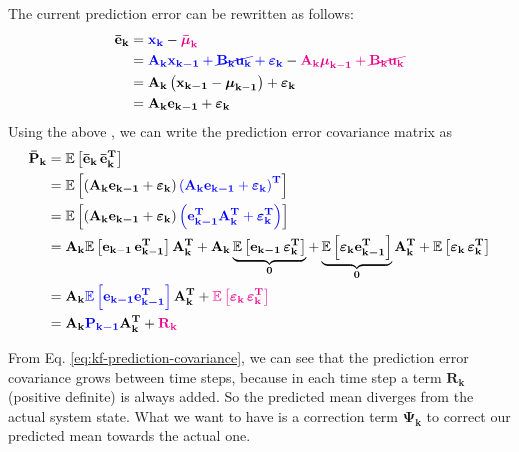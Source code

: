 \documentclass[12pt]{article}
\newcommand{\bvec}[1]{\boldsymbol{\mathbf{#1}}} %
\newcommand{\bvecT}[1]{\boldsymbol{\mathbf{#1^T}}} %
\newcommand{\mat}[1]{\boldsymbol{\mathbf{#1}}}
\newcommand{\matT}[1]{\boldsymbol{\mathbf{#1^T}}}
\newcommand{\brac}[1]{\left[#1\right]} %
\newcommand{\parentheses}[1]{\left(#1\right)}
\newcommand{\mb}[1]{{\boldsymbol{#1}}} %
\newcommand{\expv}[1]{\mathbb{E}\brac{#1}} %
\newcommand{\eps}{\varepsilon}
\newcommand{\blue}[1]{\color{blue}#1\color{black}}
\newcommand{\magenta}[1]{\color{magenta}#1\color{black}}
\begin{document}
The current prediction error can be rewritten as follows:
\begin{equation}
    \begin{aligned}
        \bvec{\bar{e}_k} &= \blue{\bvec{x_k}} - \magenta{\mb{\bar{\mu}}_\mathbf{k}} \\
        &= \blue{\mat{A_k}\bvec{x_{k-1}} + \cancel{\mat{B_k}\bvec{u_k}} + \mb{\eps}_\mathbf{k}} - \magenta{\mat{A_k} \mb{\mu}_\mathbf{k-1} + \cancel{\mat{B_k}\bvec{u_k}} }\\
        &= \mat{A_k}\parentheses{\bvec{x_{k-1}} - \mb{\mu}_\mathbf{k-1}} + \mb{\eps}_\mathbf{k} \\
        &= \mat{A_k}\bvec{e_{k-1}} + \mb{\eps}_\mathbf{k}
    \end{aligned}
\end{equation}
Using the above , we can write the prediction error covariance matrix as
\begin{equation}
    \begin{aligned}
        \mat{\bar{P}_k} &= \expv{\bvec{\bar{e}_k} \, \bvecT{\bar{e}_k}}\\
        &= \expv{\parentheses{\mat{A_k}\bvec{e_{k-1}} + \mb{\varepsilon}_\mathbf{k}} \blue{\parentheses{\mat{A_k}\bvec{e_{k-1}} + \mb{\varepsilon}_\mathbf{k}}^\mathbf{T}}}\\
        &= \expv{\parentheses{\mat{A_k}\bvec{e_{k-1}} + \mb{\varepsilon}_\mathbf{k}} \blue{\parentheses{\bvecT{e_{k-1}}\matT{A_k} + \mb{\varepsilon}_\mathbf{k}^\mathbf{T}}}}\\
        &= \mat{A_k}\expv{\mathbf{e_{k-1}\,e_{k-1}^T}}\matT{A_k} + \mat{A_k}\underbrace{\expv{\bvec{e_{k-1}}\,\mb{\eps}_\mathbf{k}^\mathbf{T}}}_{\mat{0}}+ \underbrace{\expv{\mb{\varepsilon}_\mathbf{k}\bvecT{e_{k-1}}}}_{\mat{0}}\matT{A_k} + \expv{\mb{\varepsilon}_\mathbf{k}\,\mb{\varepsilon}_\mathbf{k}^\mathbf{T}}\\
        &= \mat{A_k} \blue{\expv{\bvec{e_{k-1}} \bvecT{e_{k-1}}}} \matT{A_k} + \magenta{\expv{\mb{\varepsilon}_\mathbf{k}\,\mb{\varepsilon}_\mathbf{k}^\mathbf{T}}}\\
        &= \mat{A_k} \blue{\mat{P_{k-1}}} \matT{A_k} + \magenta{\mat{R_k}}
    \end{aligned}
    \label{eq:kf-prediction-covariance}
\end{equation}

From Eq. \ref{eq:kf-prediction-covariance}, we can see that the prediction error covariance grows between time steps, because in each time step a term $\mat{R_k}$ (positive definite) is always added. So the predicted mean diverges from the actual system state. What we want to have is a correction term $\mat{\Psi_k}$ to correct our predicted mean towards the actual one.
\end{document}
